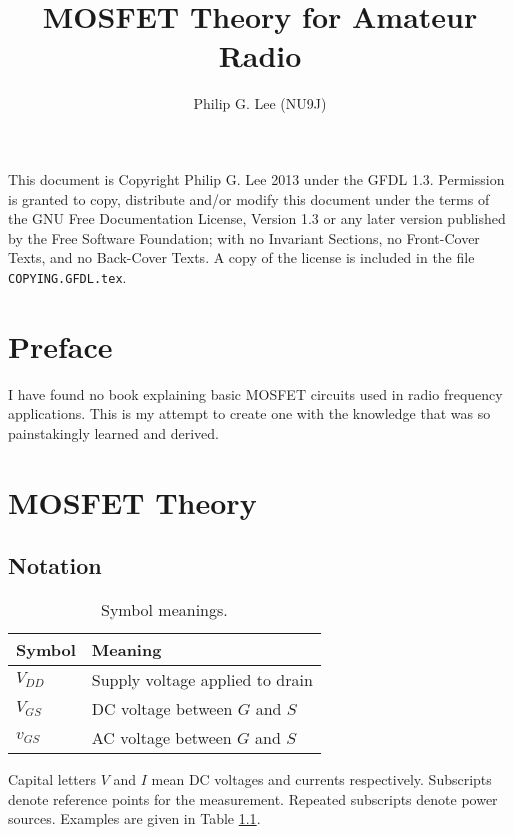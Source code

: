 \documentclass[letterpaper,10pt]{report}
\title{MOSFET Theory for Amateur Radio}
\author{Philip G. Lee (NU9J)}
\begin{document}
\maketitle

This document is Copyright Philip G. Lee 2013 under the GFDL 1.3.
Permission is granted to copy, distribute and/or modify this document
under the terms of the GNU Free Documentation License, Version 1.3 
or any later version published by the Free Software Foundation;
with no Invariant Sections, no Front-Cover Texts, and no Back-Cover Texts.
A copy of the license is included in the file \texttt{COPYING.GFDL.tex}.

\tableofcontents

\chapter*{Preface}%

I have found no book explaining basic MOSFET circuits used in radio frequency
applications. This is my attempt to create one with the knowledge that was so
painstakingly learned and derived.

\chapter{MOSFET Theory}%

\section{Notation}

\begin{table}
 \begin{tabular}{l|l}
  Symbol & Meaning \\
  \hline
  $V_{DD}$ & Supply voltage applied to drain\\
  $V_{GS}$ & DC voltage between $G$ and $S$\\
  $v_{GS}$ & AC voltage between $G$ and $S$
 \end{tabular}
 \caption{Symbol meanings.}
 \label{tab:symbols}
\end{table}

Capital letters $V$ and $I$ mean DC voltages and currents respectively.
Subscripts denote reference points for the measurement. Repeated subscripts
denote power sources. Examples are given in Table \ref{tab:symbols}.
\end{document}
